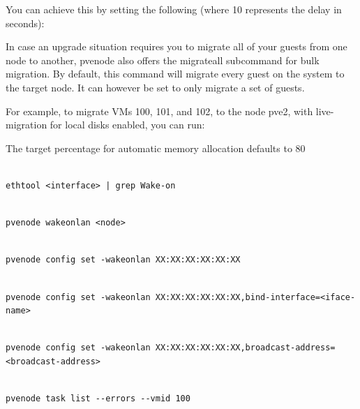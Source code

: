You can achieve this by setting the following (where 10 represents the delay in seconds):

In case an upgrade situation requires you to migrate all of your guests from one node to another, pvenode also offers the migrateall subcommand for bulk migration. By default, this command will migrate every guest on the system to the target node. It can however be set to only migrate a set of guests.

For example, to migrate VMs 100, 101, and 102, to the node pve2, with live-migration for local disks enabled, you can run:

The target percentage for automatic memory allocation defaults to 80%

\begin{lstlisting}

ethtool <interface> | grep Wake-on

\end{lstlisting}

\begin{lstlisting}

pvenode wakeonlan <node>

\end{lstlisting}

\begin{lstlisting}

pvenode config set -wakeonlan XX:XX:XX:XX:XX:XX

\end{lstlisting}

\begin{lstlisting}

pvenode config set -wakeonlan XX:XX:XX:XX:XX:XX,bind-interface=<iface-name>

\end{lstlisting}

\begin{lstlisting}

pvenode config set -wakeonlan XX:XX:XX:XX:XX:XX,broadcast-address=<broadcast-address>

\end{lstlisting}

\begin{lstlisting}

pvenode task list --errors --vmid 100

\end{lstlisting}

